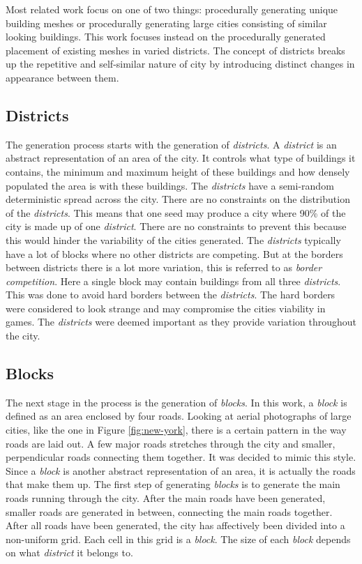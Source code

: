 Most related work focus on one of two things: procedurally generating unique building meshes\cite{PseudoInfiniteCities} or procedurally generating large cities consisting of similar looking buildings\cite{InfiniteCities}. This work focuses instead on the procedurally generated placement of existing meshes in varied districts. The concept of districts breaks up the repetitive and self-similar nature of city by introducing distinct changes in appearance between them.

	\subsection{Districts}
	The generation process starts with the generation of \textit{districts}. A \textit{district} is an abstract representation of an area of the city. It controls what type of buildings it contains, the minimum and maximum height of these buildings and how densely populated the area is with these buildings. The \textit{districts} have a semi-random deterministic spread across the city. There are no constraints on the distribution of the \textit{districts}. This means that one seed may produce a city where 90\% of the city is made up of one \textit{district}. There are no constraints to prevent this because this would hinder the variability of the cities generated. The \textit{districts} typically have a lot of blocks where no other districts are competing. But at the borders between districts there is a lot more variation, this is referred to as \textit{border competition}. Here a single block may contain buildings from all three \textit{districts}. This was done to avoid hard borders between the \textit{districts}. The hard borders were considered to look strange and may compromise the cities viability in games. The \textit{districts} were deemed important as they provide variation throughout the city.
		
	\subsection{Blocks}
	The next stage in the process is the generation of \textit{blocks}. In this work, a \textit{block} is defined as an area enclosed by four roads. Looking at aerial photographs of large cities, like the one in Figure \ref{fig:new-york}, there is a certain pattern in the way roads are laid out. A few major roads stretches through the city and smaller, perpendicular roads connecting them together. It was decided to mimic this style. Since a \textit{block} is another abstract representation of an area, it is actually the roads that make them up. The first step of generating \textit{blocks} is to generate the main roads running through the city. After the main roads have been generated, smaller roads are generated in between, connecting the main roads together. After all roads have been generated, the city has affectively been divided into a non-uniform grid. Each cell in this grid is a \textit{block}. The size of each \textit{block} depends on what \textit{district} it belongs to.
	
